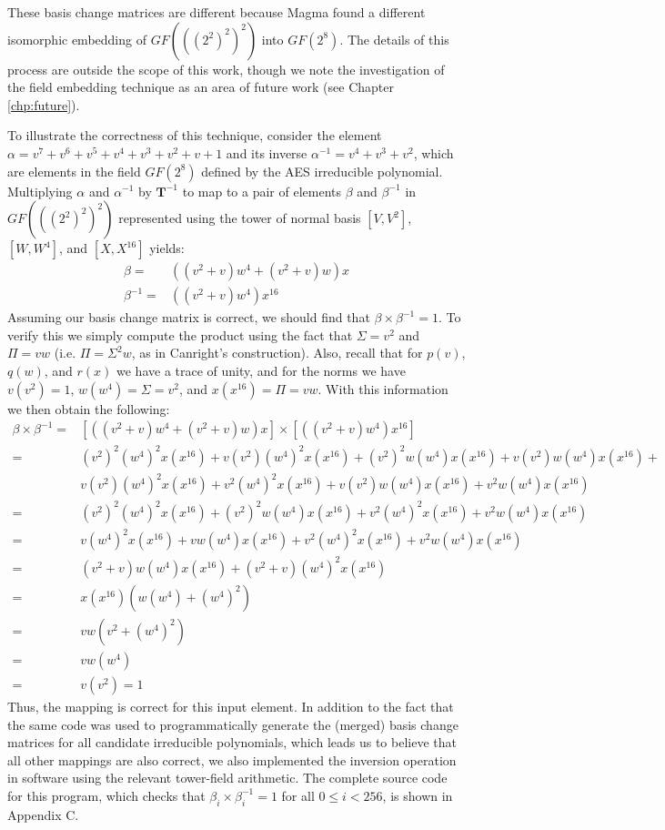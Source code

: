\vspace{1cm}

These basis change matrices are different because Magma found a different isomorphic embedding of $GF(((2^2)^2)^2)$ into $GF(2^8)$. The details of this process are outside the scope of this work, though we note the investigation of the field embedding technique as an area of future work (see Chapter \ref{chp:future}).

To illustrate the correctness of this technique, consider the element $\alpha = v^7 + v^6 + v^5 + v^4 + v^3 + v^2 + v + 1$ and its inverse $\alpha^{-1} = v^4 + v^3 + v^2$, which are elements in the field $GF(2^8)$ defined by the AES irreducible polynomial. Multiplying $\alpha$ and $\alpha^{-1}$ by $\mathbf{T}^{-1}$ to map to a pair of elements $\beta$ and $\beta^{-1}$ in $GF(((2^2)^2)^2)$ represented using the tower of normal basis $[V, V^2]$, $[W, W^4]$, and $[X, X^{16}]$ yields:
\begin{align*}
    \beta = & ((v^2 + v)w^4 + (v^2 + v)w)x \\
    \beta^{-1} = & ((v^2 + v)w^4)x^{16}
\end{align*}
Assuming our basis change matrix is correct, we should find that $\beta\times\beta^{-1} = 1$. To verify this we simply compute the product using the fact that $\Sigma = v^2$ and $\Pi = vw$ (i.e. $\Pi = \Sigma^2w$, as in Canright's construction). Also, recall that for $p(v)$, $q(w)$, and $r(x)$ we have a trace of unity, and for the norms we have $v(v^2) = 1$, $w(w^4) = \Sigma = v^2$, and $x(x^{16}) = \Pi = vw$. With this information we then obtain the following:
\begin{align*}
    \beta \times \beta^{-1} = & [((v^2 + v)w^4 + (v^2 + v)w)x] \times [((v^2 + v)w^4)x^{16}] \\
    = & (v^2)^2(w^4)^2x(x^{16}) + v(v^2)(w^4)^2x(x^{16}) + (v^2)^2w(w^4)x(x^{16}) + v(v^2)w(w^4)x(x^{16}) + \\
    & v(v^2)(w^4)^2x(x^{16}) + v^2(w^4)^2x(x^{16}) + v(v^2)w(w^4)x(x^{16}) + v^2w(w^4)x(x^{16}) \\
    = & (v^2)^2(w^4)^2x(x^{16}) + (v^2)^2w(w^4)x(x^{16}) + v^2(w^4)^2x(x^{16}) + v^2w(w^4)x(x^{16}) \\
    = & v(w^4)^2x(x^{16}) + vw(w^4)x(x^{16}) + v^2(w^4)^2x(x^{16}) + v^2w(w^4)x(x^{16}) \\
    = & (v^2 + v)w(w^4)x(x^{16}) + (v^2 + v)(w^4)^2x(x^{16}) \\
    = & x(x^{16})(w(w^4) + (w^4)^2) \\
    = & vw(v^2 + (w^4)^2) \\
    = & vw(w^4) \\
    = & v(v^2) = 1
\end{align*}
Thus, the mapping is correct for this input element. In addition to the fact that the same code was used to programmatically generate the (merged) basis change matrices for all candidate irreducible polynomials, which leads us to believe that all other mappings are also correct, we also implemented the inversion operation in software using the relevant tower-field arithmetic. The complete source code for this program, which checks that $\beta_i \times \beta_i^{-1} = 1$ for all $0 \leq i < 256$, is shown in Appendix C.

